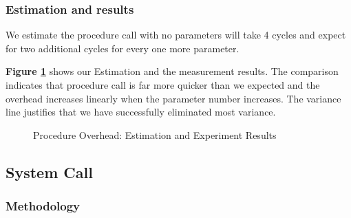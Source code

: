 
\subsubsection{Estimation and results}
We estimate the procedure call with no parameters will take 4 cycles and expect for two additional cycles for every one more parameter.

\textbf{Figure \ref{procedure_overhead_result}} shows our Estimation and the measurement results. The comparison indicates that procedure call is far more quicker than we expected and the overhead increases linearly when the parameter number increases. The variance line justifies that we have successfully eliminated most variance.


\begin{figure}[h]
    \centering
    \caption{Procedure Overhead: Estimation and Experiment Results }
    \label{procedure_overhead_result}
\end{figure}


\subsection{System Call}

\subsubsection{Methodology}

